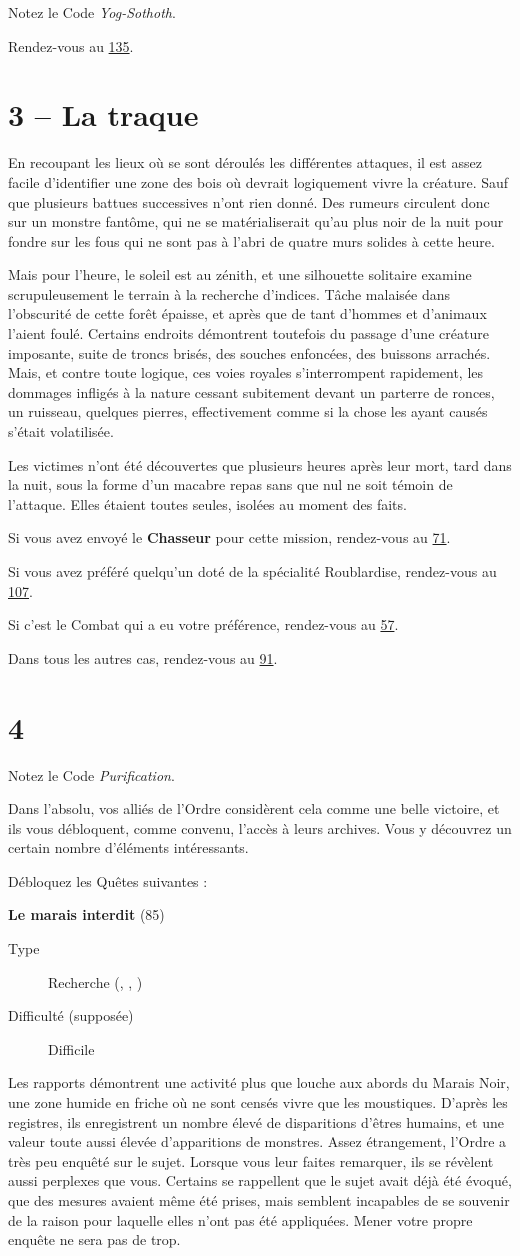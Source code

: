 \documentclass{report}
\newcommand{\gsection}[1]{
    \section{#1}
    \label{section-#1}
}
\newcommand{\glink}[1]{\hyperref[section-#1]{#1}}
\newcommand{\quest}[5]{
    \begin{mdframed}[innertopmargin=0.5cm,innerbottommargin=0.5cm,leftmargin=0.5cm,rightmargin=0.5cm]
        \begin{center}
            \textbf{#1} (#2)
        \end{center}
        \begin{description}
            \item[Type] #3
            \item[Difficulté (supposée)] #4
        \end{description}
        #5
    \end{mdframed}
}
\newcommand{\hero}[1]{\textbf{#1}}
\begin{document}
Notez le Code \emph{Yog-Sothoth}.

Rendez-vous au \glink{135}.

\gsection{3 – La traque}

En recoupant les lieux où se sont déroulés les différentes attaques, il est assez facile d'identifier une zone des bois où devrait logiquement vivre la créature. Sauf que plusieurs battues successives n'ont rien donné. Des rumeurs circulent donc sur un monstre fantôme, qui ne se matérialiserait qu'au plus noir de la nuit pour fondre sur les fous qui ne sont pas à l'abri de quatre murs solides à cette heure.

Mais pour l'heure, le soleil est au zénith, et une silhouette solitaire examine scrupuleusement le terrain à la recherche d'indices. Tâche malaisée dans l'obscurité de cette forêt épaisse, et après que de tant d'hommes et d'animaux l'aient foulé. Certains endroits démontrent toutefois du passage d'une créature imposante, suite de troncs brisés, des souches enfoncées, des buissons arrachés. Mais, et contre toute logique, ces voies royales s'interrompent rapidement, les dommages infligés à la nature cessant subitement devant un parterre de ronces, un ruisseau, quelques pierres, effectivement comme si la chose les ayant causés s'était volatilisée.

Les victimes n'ont été découvertes que plusieurs heures après leur mort, tard dans la nuit, sous la forme d'un macabre repas sans que nul ne soit témoin de l'attaque. Elles étaient toutes seules, isolées au moment des faits.

Si vous avez envoyé le \hero{Chasseur} pour cette mission, rendez-vous au \glink{71}.

Si vous avez préféré quelqu'un doté de la spécialité Roublardise, rendez-vous au \glink{107}.

Si c'est le Combat qui a eu votre préférence, rendez-vous au \glink{57}.

Dans tous les autres cas, rendez-vous au \glink{91}.

\gsection{4}

Notez le Code \emph{Purification}.

Dans l'absolu, vos alliés de l'Ordre considèrent cela comme une belle victoire, et ils vous débloquent, comme convenu, l'accès à leurs archives. Vous y découvrez un certain nombre d'éléments intéressants.

Débloquez les Quêtes suivantes :

\quest{Le marais interdit}{85}{Recherche (\ankh, \caduceus, \cross)}{Difficile}{
Les rapports démontrent une activité plus que louche aux abords du Marais Noir, une zone humide en friche où ne sont censés vivre que les moustiques. D'après les registres, ils enregistrent un nombre élevé de disparitions d'êtres humains, et une valeur toute aussi élevée d'apparitions de monstres. Assez étrangement, l'Ordre a très peu enquêté sur le sujet. Lorsque vous leur faites remarquer, ils se révèlent aussi perplexes que vous. Certains se rappellent que le sujet avait déjà été évoqué, que des mesures avaient même été prises, mais semblent incapables de se souvenir de la raison pour laquelle elles n'ont pas été appliquées. Mener votre propre enquête ne sera pas de trop.
}
\end{document}
